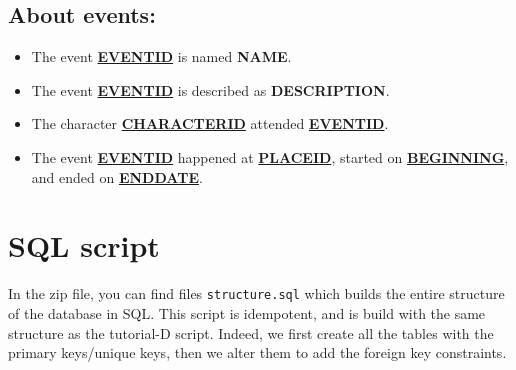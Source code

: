 \documentclass[a4paper ,12pt,french]{article}
\begin{document}
\subsection*{About events:}
\begin{itemize}
\item The event \underline{\textbf{EVENTID}} is named \textbf{NAME}.
\item The event \underline{\textbf{EVENTID}} is described as \textbf{DESCRIPTION}.
\item The character \underline{\textbf{CHARACTERID}} attended \underline{\textbf{EVENTID}}.
\item The event \underline{\textbf{EVENTID}} happened at \underline{\textbf{PLACEID}}, started on \underline{\textbf{BEGINNING}}, and ended on \underline{\textbf{ENDDATE}}.
\end{itemize}

\section{SQL script}

In the zip file, you can find files \texttt{structure.sql} which builds the entire structure of the database in SQL. This script is idempotent, and is build with the same structure as the tutorial-D script. Indeed, we first create all the tables with the primary keys/unique keys, then we alter them to add the foreign key constraints.
\end{document}
